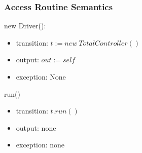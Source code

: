 \documentclass[12pt]{article}
\begin{document}
\subsubsection*{Access Routine Semantics}
\noindent new Driver():
\begin{itemize}
\item transition: $t := new\ TotalController()$
\item output: $out := \mathit{self}$
\item exception: None
\end{itemize}

\noindent run()
\begin{itemize}
\item transition: $t.run()$
\item output: none
\item exception: none
\end{itemize}
\newpage
\end{document}
